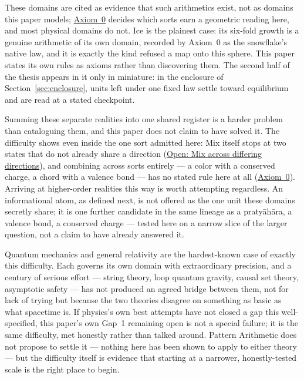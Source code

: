 \documentclass[12pt, a4paper]{article}
\begin{document}
These domains are cited as evidence that such arithmetics exist, not
as domains this paper models;
\hyperref[subsec:axiom0_admissibility]{Axiom~0} decides which sorts
earn a geometric reading here, and most physical domains do not.
Ice is the plainest case: its six-fold growth is a genuine arithmetic
of its own domain, recorded by Axiom~0 as the snowflake's native law,
and it is exactly the kind refused a map onto this sphere. This
paper states its own rules as axioms rather than discovering them.
The second half of the thesis appears in it only in miniature: in the
enclosure of Section~\ref{sec:enclosure}, units left under one fixed
law settle toward equilibrium and are read at a stated checkpoint.

Summing these separate realities into one shared register is a
harder problem than cataloguing them, and this paper does not claim
to have solved it. The difficulty shows even inside the one sort
admitted here: Mix itself stops at two states that do not already
share a direction
(\hyperref[subsec:mix_scattered_open]{Open: Mix across differing
directions}), and combining across sorts entirely --- a color with a
conserved charge, a chord with a valence bond --- has no stated rule
here at all (\hyperref[subsec:axiom0_admissibility]{Axiom~0}).
Arriving at higher-order realities this way is worth attempting
regardless. An informational atom, as defined next, is not offered
as the one unit these domains secretly share; it is one further
candidate in the same lineage as a pratyāhāra, a valence bond, a
conserved charge --- tested here on a narrow slice of the larger
question, not a claim to have already answered it.

Quantum mechanics and general relativity are the hardest-known case
of exactly this difficulty. Each governs its own domain with
extraordinary precision, and a century of serious effort --- string
theory, loop quantum gravity, causal set theory, asymptotic safety
--- has not produced an agreed bridge between them, not for lack of
trying but because the two theories disagree on something as basic
as what spacetime is. If physics's own best attempts have not closed
a gap this well-specified, this paper's own Gap~1 remaining open is
not a special failure; it is the same difficulty, met honestly rather
than talked around. Pattern Arithmetic does not propose to settle
it --- nothing here has been shown to apply to either theory --- but
the difficulty itself is evidence that starting at a narrower,
honestly-tested scale is the right place to begin.
\end{document}
